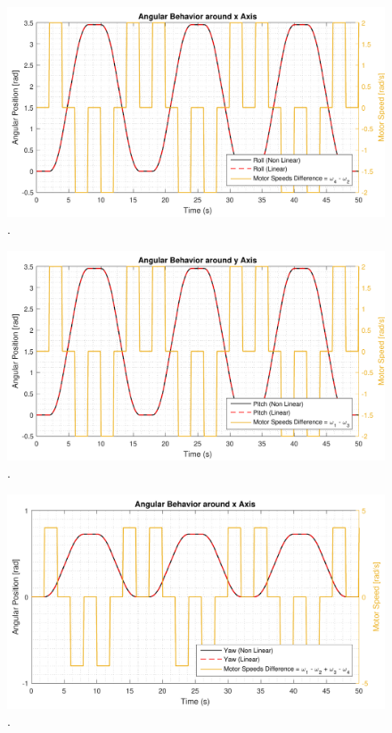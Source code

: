 \begin{figure}[H]
	\centering
	\includegraphics[scale=0.65]{figures/rollCompModel}
	\caption{.}
	\label{fig:rollCompModel}
\end{figure}

\begin{figure}[H]
	\centering
	\includegraphics[scale=0.65]{figures/pitchCompModel}
	\caption{.}
	\label{fig:pitchCompModel}
\end{figure}

\begin{figure}[H]
	\centering
	\includegraphics[scale=0.55]{figures/yawCompModel}
	\caption{.}
	\label{fig:yawCompModel}
\end{figure}

